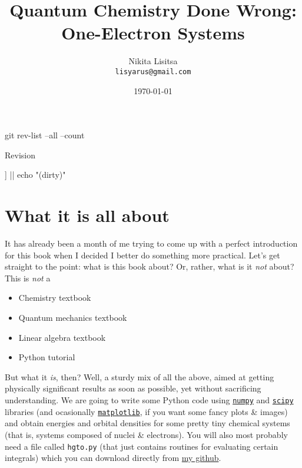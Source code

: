 \documentclass{article}
\newcommand{\githubrepo}{https://github.com/lisyarus/chembook}
\begin{document}
\title{Quantum Chemistry Done Wrong: \\ One-Electron Systems}
\author{Nikita Lisitsa \\ \texttt{lisyarus@gmail.com}}
\date{\today}

\maketitle

\bash
git rev-list --all --count
\END
\centerline{Revision \bashStdout}

\bash
[[ "$(git diff --stat)" == "" ]] || echo "(dirty)"
\END
\centerline{\bashStdout}

\newpage

\tableofcontents

\newpage

\section{What it is all about}

It has already been a month of me trying to come up with a perfect introduction for this book when I decided I better do something more practical. Let's get straight to the point: what is this book about? Or, rather, what is it \textit{not} about? This is \textit{not} a

\begin{itemize}
\item Chemistry textbook
\item Quantum mechanics textbook
\item Linear algebra textbook
\item Python tutorial
\end{itemize}

But what it \textit{is}, then? Well, a sturdy mix of all the above, aimed at getting physically significant results as soon as possible, yet without sacrificing understanding. We are going to write some Python code using \href{https://numpy.org}{\texttt{numpy}} and \href{https://www.scipy.org}{\texttt{scipy}} libraries (and ocasionally \href{https://matplotlib.org}{\texttt{matplotlib}}, if you want some fancy plots \& images) and obtain energies and orbital densities for some pretty tiny chemical systems (that is, systems composed of nuclei \& electrons). You will also most probably need a file called \texttt{hgto.py} (that just contains routines for evaluating certain integrals) which you can download directly from \href{\githubrepo/blob/master/code/hgto.py}{my github}.
\end{document}
